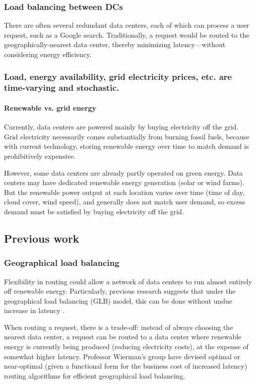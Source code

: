 \documentclass{acm_proc_article-sp}
\begin{document}
	\subsubsection{Load balancing between DCs}
		There are often several redundant data centers, each of which can process a user request, such as a Google search. Traditionally, a request would be routed to the geographically-nearest data center, thereby minimizing latency—without considering energy efficiency.
	\subsubsection{Load, energy availability, grid electricity prices, etc. are time-varying and stochastic.}
		\paragraph{Renewable vs. grid energy}
			Currently, data centers are powered mainly by buying electricity off the grid. Grid electricity necessarily comes substantially from burning fossil fuels, because with current technology, storing renewable energy over time to match demand is prohibitively expensive.
			
			However, some data centers are already partly operated on green energy. Data centers may have dedicated renewable energy generation (solar or wind farms). But the renewable power output at each location varies over time (time of day, cloud cover, wind speed), and generally does not match user demand, so excess demand must be satisfied by buying electricity off the grid.


\subsection{Previous work}
	\subsubsection{Geographical load balancing}
		Flexibility in routing could allow a network of data centers to run almost entirely off renewable energy. Particularly, previous research suggests that under the geographical load balancing (GLB) model, this can be done without undue increase in latency \cite{adam:GLB}.
		
		When routing a request, there is a trade-off: instead of always choosing the nearest data center, a request can be routed to a data center where renewable energy is currently being produced (reducing electricity costs), at the expense of somewhat higher latency. Professor Wierman’s group have devised optimal or near-optimal (given a functional form for the business cost of increased latency) routing algorithms for efficient geographical load balancing.
		
\end{document}
